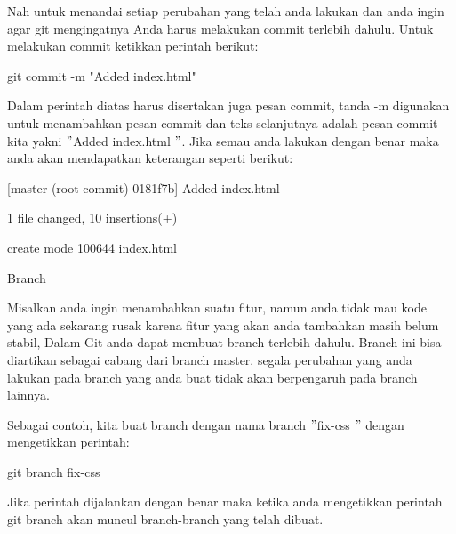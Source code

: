 \vspace{\baselineskip}
\noindent 
 \hspace*{0.5in} Nah untuk menandai setiap perubahan yang telah anda lakukan dan anda ingin agar git mengingatnya Anda harus melakukan commit terlebih dahulu. Untuk melakukan commit ketikkan perintah berikut: \par
 \vspace{\baselineskip}
\noindent 
 \hspace*{0.5in} git commit -m "Added index.html" \par
\noindent 
Dalam perintah diatas harus disertakan juga pesan commit, tanda -m digunakan untuk menambahkan pesan commit dan teks selanjutnya adalah pesan commit kita yakni  $ " $Added index.html $ " $. Jika semau anda lakukan dengan benar maka anda akan mendapatkan keterangan seperti berikut: \par
\vspace{\baselineskip}
\noindent 
 \hspace*{0.5in} [master (root-commit) 0181f7b] Added index.html \par
\noindent 
 \hspace*{0.5in}  1 file changed, 10 insertions(+) \par
\noindent 
 \hspace*{0.5in}  create mode 100644 index.html \par
\noindent 
 \hspace*{0.5in} Branch \par
 \vspace{\baselineskip}
\noindent 
Misalkan anda ingin menambahkan suatu fitur, namun anda tidak mau kode yang ada sekarang rusak karena fitur yang akan anda tambahkan masih belum stabil, Dalam Git anda dapat membuat branch terlebih dahulu. Branch ini bisa diartikan sebagai cabang dari branch master. segala perubahan yang anda lakukan pada branch yang anda buat tidak akan berpengaruh pada branch lainnya. \par
\noindent 
Sebagai contoh, kita buat branch dengan nama branch  $ " $fix-css $ " $ dengan mengetikkan perintah: \par
\vspace{\baselineskip}
\noindent 
 \hspace*{0.5in} git branch fix-css \par
 \vspace{\baselineskip}
\noindent 
Jika perintah dijalankan dengan benar maka ketika anda mengetikkan perintah git branch akan muncul branch-branch yang telah dibuat. \par
